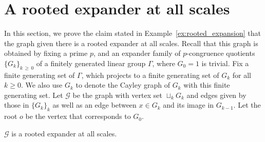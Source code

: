 \documentclass[AHL,Unicode,longabstracts,published]{cedram}
\newcommand{\calG}{\mathcal{G}}
\begin{document}
\section{A rooted expander at all scales}\label{sec:rooted-expander}

In this section, we prove the claim stated in Example~\ref{ex:rooted_expansion} that the graph given there is a rooted expander at all scales. Recall that this graph is obtained by fixing a prime $p$, and an expander family of $p$-congruence quotients $\{G_k\}_{k\,\geq\,0}$ of a finitely generated linear group $\Gamma$, where $G_0=1$ is trivial. Fix a finite generating set of $\Gamma$, which projects to a finite generating set of $G_k$ for all $k\geq 0$. We also use $G_k$ to denote the Cayley graph of $G_k$ with this finite generating set. Let $\calG$ be the graph with vertex set $\sqcup_k G_k$ and edges given by those in $\{G_k\}_k$ as well as an edge between $x\in G_k$ and its image in $G_{k-1}$. Let the root $o$ be the vertex that corresponds to $G_0$.

\begin{prop}\label{prop:rooted_expansion}
$\calG$ is a rooted expander at all scales.
\end{prop}
\end{document}

